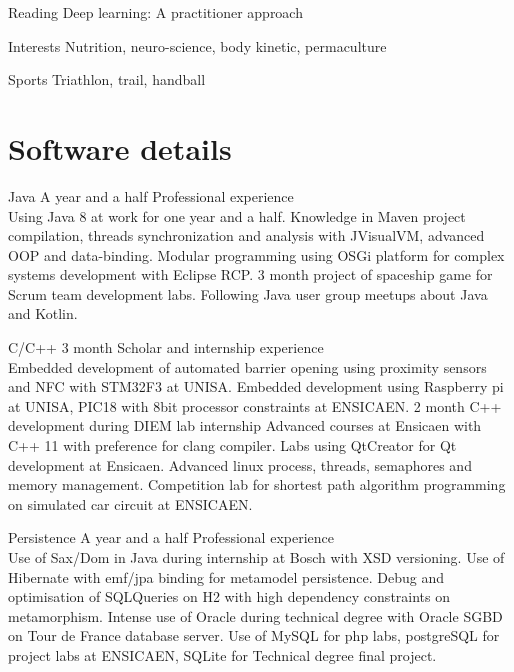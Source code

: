 \documentclass{tccv-master/tccv}
\begin{document}
\begin{factlist}

\item{Reading}
	{Deep learning: A practitioner approach}
\item{Interests}
	{Nutrition, neuro-science, body kinetic, permaculture}
\item{Sports}
	{Triathlon, trail, handball}
\end{factlist}
\newpage




\section{Software details}

\begin{eventlist}

\item
{Java}
{A year and a half}
{Professional experience}\\
Using Java 8 at work for one year and a half.
Knowledge in Maven project compilation, threads synchronization and analysis with JVisualVM, advanced OOP and data-binding.
Modular programming using OSGi platform for complex systems development with Eclipse RCP.
3 month project of spaceship game for Scrum team development labs.
Following Java user group meetups about Java and Kotlin. 

\item
{C/C++}
{3 month}
{Scholar and internship experience}\\
Embedded development of automated barrier opening using proximity sensors and NFC with STM32F3 at UNISA.
Embedded development using Raspberry pi at UNISA, PIC18 with 8bit processor constraints at ENSICAEN.
2 month C++ development during DIEM lab internship 
Advanced courses at Ensicaen with C++ 11 with preference for clang compiler.
Labs using QtCreator for Qt development at Ensicaen.
Advanced linux process, threads, semaphores and memory management.
Competition lab for shortest path algorithm programming on simulated car circuit at ENSICAEN.


\item
{Persistence}
{A year and a half}
{Professional experience}\\
Use of Sax/Dom in Java during internship at Bosch with XSD versioning.
Use of Hibernate with emf/jpa binding for metamodel persistence. 
Debug and optimisation of SQLQueries on H2 with high dependency constraints on metamorphism.
Intense use of Oracle during technical degree with Oracle SGBD on Tour de France database server.
Use of MySQL for php labs, postgreSQL for project labs at ENSICAEN, SQLite for Technical degree final project.


\end{eventlist}
\end{document}
